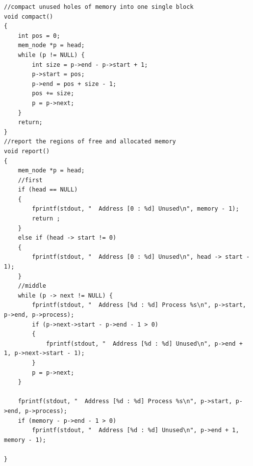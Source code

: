 \documentclass{article}
\begin{document}
\begin{lstlisting}[language={[ANSI]C}]
//compact unused holes of memory into one single block
void compact()
{
	int pos = 0;
	mem_node *p = head;
	while (p != NULL) {
		int size = p->end - p->start + 1;
		p->start = pos;
		p->end = pos + size - 1;
		pos += size;		
		p = p->next;
	}
	return;
}
//report the regions of free and allocated memory
void report()
{
	mem_node *p = head;
	//first
	if (head == NULL) 
	{
		fprintf(stdout, "  Address [0 : %d] Unused\n", memory - 1);
		return ;
	} 
	else if (head -> start != 0) 
	{
		fprintf(stdout, "  Address [0 : %d] Unused\n", head -> start - 1);
	}
	//middle
	while (p -> next != NULL) {
		fprintf(stdout, "  Address [%d : %d] Process %s\n", p->start, p->end, p->process);
		if (p->next->start - p->end - 1 > 0) 
		{
			fprintf(stdout, "  Address [%d : %d] Unused\n", p->end + 1, p->next->start - 1);
		}
		p = p->next;
	}
	
	fprintf(stdout, "  Address [%d : %d] Process %s\n", p->start, p->end, p->process);
	if (memory - p->end - 1 > 0)
		fprintf(stdout, "  Address [%d : %d] Unused\n", p->end + 1, memory - 1);

}
\end{lstlisting}
\newpage
\end{document}
